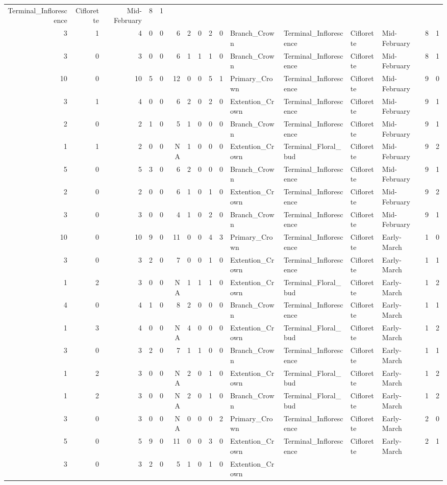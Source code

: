 \documentclass[]{article}
\begin{document}
\begin{longtable}[]{@{}rrrrrrrrrrllllrl@{}}
Terminal\_Inflorescence & Ciflorette & Mid-February & 8 &
1\tabularnewline
3 & 1 & 4 & 0 & 0 & 6 & 2 & 0 & 2 & 0 & Branch\_Crown &
Terminal\_Inflorescence & Ciflorette & Mid-February & 8 &
1\tabularnewline
3 & 0 & 3 & 0 & 0 & 6 & 1 & 1 & 1 & 0 & Branch\_Crown &
Terminal\_Inflorescence & Ciflorette & Mid-February & 8 &
1\tabularnewline
10 & 0 & 10 & 5 & 0 & 12 & 0 & 0 & 5 & 1 & Primary\_Crown &
Terminal\_Inflorescence & Ciflorette & Mid-February & 9 &
0\tabularnewline
3 & 1 & 4 & 0 & 0 & 6 & 2 & 0 & 2 & 0 & Extention\_Crown &
Terminal\_Inflorescence & Ciflorette & Mid-February & 9 &
1\tabularnewline
2 & 0 & 2 & 1 & 0 & 5 & 1 & 0 & 0 & 0 & Branch\_Crown &
Terminal\_Inflorescence & Ciflorette & Mid-February & 9 &
1\tabularnewline
1 & 1 & 2 & 0 & 0 & NA & 1 & 0 & 0 & 0 & Extention\_Crown &
Terminal\_Floral\_bud & Ciflorette & Mid-February & 9 & 2\tabularnewline
5 & 0 & 5 & 3 & 0 & 6 & 2 & 0 & 0 & 0 & Branch\_Crown &
Terminal\_Inflorescence & Ciflorette & Mid-February & 9 &
1\tabularnewline
2 & 0 & 2 & 0 & 0 & 6 & 1 & 0 & 1 & 0 & Extention\_Crown &
Terminal\_Inflorescence & Ciflorette & Mid-February & 9 &
2\tabularnewline
3 & 0 & 3 & 0 & 0 & 4 & 1 & 0 & 2 & 0 & Branch\_Crown &
Terminal\_Inflorescence & Ciflorette & Mid-February & 9 &
1\tabularnewline
10 & 0 & 10 & 9 & 0 & 11 & 0 & 0 & 4 & 3 & Primary\_Crown &
Terminal\_Inflorescence & Ciflorette & Early-March & 1 &
0\tabularnewline
3 & 0 & 3 & 2 & 0 & 7 & 0 & 0 & 1 & 0 & Extention\_Crown &
Terminal\_Inflorescence & Ciflorette & Early-March & 1 &
1\tabularnewline
1 & 2 & 3 & 0 & 0 & NA & 1 & 1 & 1 & 0 & Extention\_Crown &
Terminal\_Floral\_bud & Ciflorette & Early-March & 1 & 2\tabularnewline
4 & 0 & 4 & 1 & 0 & 8 & 2 & 0 & 0 & 0 & Branch\_Crown &
Terminal\_Inflorescence & Ciflorette & Early-March & 1 &
1\tabularnewline
1 & 3 & 4 & 0 & 0 & NA & 4 & 0 & 0 & 0 & Extention\_Crown &
Terminal\_Floral\_bud & Ciflorette & Early-March & 1 & 2\tabularnewline
3 & 0 & 3 & 2 & 0 & 7 & 1 & 1 & 0 & 0 & Branch\_Crown &
Terminal\_Inflorescence & Ciflorette & Early-March & 1 &
1\tabularnewline
1 & 2 & 3 & 0 & 0 & NA & 2 & 0 & 1 & 0 & Extention\_Crown &
Terminal\_Floral\_bud & Ciflorette & Early-March & 1 & 2\tabularnewline
1 & 2 & 3 & 0 & 0 & NA & 2 & 0 & 1 & 0 & Branch\_Crown &
Terminal\_Floral\_bud & Ciflorette & Early-March & 1 & 2\tabularnewline
3 & 0 & 3 & 0 & 0 & NA & 0 & 0 & 0 & 2 & Primary\_Crown &
Terminal\_Inflorescence & Ciflorette & Early-March & 2 &
0\tabularnewline
5 & 0 & 5 & 9 & 0 & 11 & 0 & 0 & 3 & 0 & Extention\_Crown &
Terminal\_Inflorescence & Ciflorette & Early-March & 2 &
1\tabularnewline
3 & 0 & 3 & 2 & 0 & 5 & 1 & 0 & 1 & 0 & Extention\_Crown &

\end{longtable}
\end{document}
